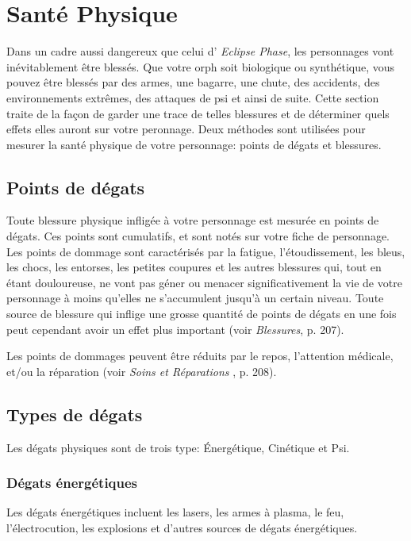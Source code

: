 \section{Santé Physique} \label{sec:physical-health} 

Dans un cadre aussi dangereux que celui d' \emph{Eclipse Phase}, les personnages vont inévitablement être blessés. Que votre orph soit biologique ou synthétique, vous pouvez être blessés par des armes, une bagarre, une chute, des accidents, des environnements extrêmes, des attaques de psi et ainsi de suite. Cette section traite de la façon de garder une trace de telles blessures et de déterminer quels effets elles auront sur votre peronnage. Deux méthodes sont utilisées pour mesurer la santé physique de votre personnage: points de dégats et blessures. 

\subsection{Points de dégats} \label{sec:damage-points} 

Toute blessure physique infligée à votre personnage est mesurée en points de dégats. Ces points sont cumulatifs, et sont notés sur votre fiche de personnage. Les points de dommage sont caractérisés par la fatigue, l'étoudissement, les bleus, les chocs, les entorses, les petites coupures et les autres blessures qui, tout en étant douloureuse, ne vont pas géner ou menacer significativement la vie de votre personnage à moins qu'elles ne s'accumulent jusqu'à un certain niveau. Toute source de blessure qui inflige une grosse quantité de points de dégats en une fois peut cependant avoir un effet plus important (voir \emph{Blessures}, p. 207). 

Les points de dommages peuvent être réduits par le repos, l'attention médicale, et/ou la réparation (voir \emph{Soins et Réparations }, p. 208). 

\subsection{Types de dégats} \label{sec:damage-types} 

Les dégats physiques sont de trois type: Énergétique, Cinétique et Psi. 

\subsubsection{Dégats énergétiques} 

Les dégats énergétiques incluent les lasers, les armes à plasma, le feu, l'électrocution, les explosions et d'autres sources de dégats énergétiques. 

